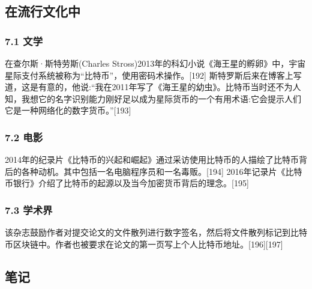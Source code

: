 \subsection{在流行文化中}
\subsubsection{7.1 文学}
在查尔斯·斯特劳斯(Charles Stross)2013年的科幻小说《海王星的孵卵》中，宇宙星际支付系统被称为“比特币”，使用密码术操作。[192] 斯特罗斯后来在博客上写道，这是有意的，他说:“我在2011年写了《海王星的幼虫》。比特币当时还不为人知，我想它的名字识别能力刚好足以成为星际货币的一个有用术语:它会提示人们它是一种网络化的数字货币。”[193]
\subsubsection{7.2 电影}
2014年的纪录片《比特币的兴起和崛起》通过采访使用比特币的人描绘了比特币背后的各种动机。其中包括一名电脑程序员和一名毒贩。[194] 2016年记录片《比特币银行》介绍了比特币的起源以及当今加密货币背后的理念。[195]
\subsubsection{7.3 学术界}
该杂志鼓励作者对提交论文的文件散列进行数字签名，然后将文件散列标记到比特币区块链中。作者也被要求在论文的第一页写上个人比特币地址。[196][197]

\subsection{笔记}